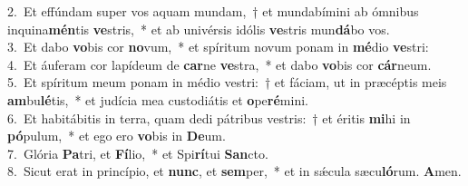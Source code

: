 {2.~}Et effúndam super vos aquam mundam,~† et mundabímini ab ómnibus inquina\textbf{mén}tis \textbf{ve}stris,~* et ab univérsis idólis \textbf{ve}stris mun\textbf{dá}bo vos.\\
{3.~}Et dabo \textbf{vo}bis cor \textbf{no}vum,~* et spíritum novum ponam in \textbf{mé}dio \textbf{ve}stri:\\
{4.~}Et áuferam cor lapídeum de \textbf{car}ne \textbf{ve}stra,~* et dabo \textbf{vo}bis cor \textbf{cár}neum.\\
{5.~}Et spíritum meum ponam in médio vestri:~† et fáciam, ut in præcéptis meis \textbf{am}bu\textbf{lé}tis,~* et judícia mea custodiátis et \textbf{o}pe\textbf{ré}mini.\\
{6.~}Et habitábitis in terra, quam dedi pátribus vestris:~† et éritis \textbf{mi}hi in \textbf{pó}pulum,~* et ego ero \textbf{vo}bis in \textbf{De}um.\\
{7.~}Glória \textbf{Pa}tri, et \textbf{Fí}lio,~* et Spi\textbf{rí}tui \textbf{San}cto.\\
{8.~}Sicut erat in princípio, et \textbf{nunc}, et \textbf{sem}per,~* et in sǽcula sæcu\textbf{ló}rum. \textbf{A}men.\\
